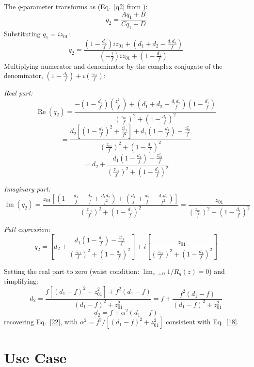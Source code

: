 \documentclass[11pt, letterpaper]{article}
\begin{document}
\begin{enumerate}
The $q$-parameter transforms as (Eq.~\ref{q2} from \cite{Osche}):
\begin{equation}\label{q2}
q_2 = \frac{A q_1 + B}{C q_1 + D}
\end{equation}
Substituting $q_1=iz_{01}$:
$$q_2=\frac{\left(1 - \frac{d_2}{f}\right)iz_{01} + \left(d_1 + d_2 - \frac{d_1 d_2}{f}\right)}{\left(-\frac{1}{f}\right)iz_{01} + \left(1 - \frac{d_1}{f}\right)}$$
Multiplying numerator and denominator by the complex conjugate of the denominator,
$\left(1 - \frac{d_1}{f}\right)+i\left(\frac{z_{01}}{f}\right)$:

\medskip
\textit{Real part:}
$$\operatorname{Re}(q_2)=\frac{-\left(1-\frac{d_2}{f}\right)\left(\frac{z_{01}^2}{f}\right)+\left(d_1+d_2-\frac{d_1d_2}{f}\right)\left(1-\frac{d_1}{f}\right)}{\left(\frac{z_{01}}{f}\right)^2+\left(1-\frac{d_1}{f}\right)^2}$$
$$=\frac{d_2\left[\left(1 - \frac{d_1}{f}\right)^2 + \frac{z_{01}^2}{f^2}\right] + d_1\left(1 - \frac{d_1}{f}\right) - \frac{z_{01}^2}{f}}{\left(\frac{z_{01}}{f}\right)^2+\left(1-\frac{d_1}{f}\right)^2}$$
$$= d_2 + \frac{d_1\left(1 - \frac{d_1}{f}\right) - \frac{z_{01}^2}{f}}{\left(\frac{z_{01}}{f}\right)^2+\left(1-\frac{d_1}{f}\right)^2}$$

\medskip
\textit{Imaginary part:}
$$\operatorname{Im}(q_2)=\frac{z_{01}\left[\left(1-\frac{d_1}{f}-\frac{d_2}{f}+\frac{d_1d_2}{f^2}\right)+\left(\frac{d_1}{f}+\frac{d_2}{f}-\frac{d_1d_2}{f^2}\right)\right]}{\left(\frac{z_{01}}{f}\right)^2+\left(1-\frac{d_1}{f}\right)^2}
=\frac{z_{01}}{\left(\frac{z_{01}}{f}\right)^2+\left(1-\frac{d_1}{f}\right)^2}$$

\medskip
\textit{Full expression:}
$$q_2=\left[d_2 + \frac{d_1\!\left(1 - \frac{d_1}{f}\right) - \frac{z_{01}^2}{f}}{\left(\frac{z_{01}}{f}\right)^2+\left(1-\frac{d_1}{f}\right)^2}\right]+i\left[\frac{z_{01}}{\left(\frac{z_{01}}{f}\right)^2+\left(1-\frac{d_1}{f}\right)^2}\right]$$

Setting the real part to zero (waist condition: $\lim_{z\to 0}1/R_g(z)=0$) and simplifying:
$$d_2 = \frac{f\!\left[(d_1-f)^2 + z_{01}^2\right] + f^2(d_1-f)}{(d_1-f)^2+z_{01}^2}
= f + \frac{f^2(d_1-f)}{(d_1-f)^2+z_{01}^2}$$
$$\boxed{d_2 = f + \alpha^2(d_1 - f)}$$
recovering Eq.~\ref{22}, with $\alpha^2 = f^2/[(d_1-f)^2+z_{01}^2]$ consistent with Eq.~\ref{18}.
\end{enumerate}

\section{Use Case}
\end{document}
